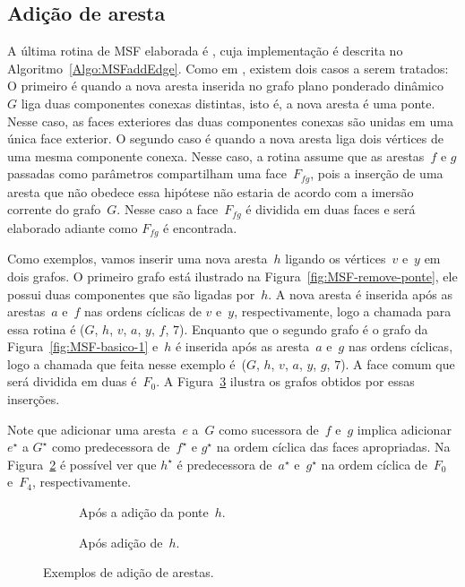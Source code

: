 \subsection{Adição de aresta}

A última rotina de MSF elaborada é \MSFaddEdge{}, cuja implementação é descrita no Algoritmo~\ref{Algo:MSFaddEdge}.
Como em \MSFdelEdge{}, existem dois casos a serem tratados: O primeiro é quando a nova aresta inserida no grafo plano ponderado dinâmico~$G$ liga duas componentes conexas distintas, isto é, a nova aresta é uma ponte.
Nesse caso, as faces exteriores das duas componentes conexas são unidas em uma única face exterior.
O segundo caso é quando a nova aresta liga dois vértices de uma mesma componente conexa.
Nesse caso, a rotina \MSFaddEdge{} assume que as arestas~$f$ e $g$ passadas como parâmetros compartilham uma face~$F_{fg}$, pois a inserção de uma aresta que não obedece essa hipótese não estaria de acordo com a imersão corrente do grafo~$G$.
Nesse caso a face~$F_{fg}$ é dividida em duas faces e será elaborado adiante como $F_{fg}$ é encontrada.

Como exemplos, vamos inserir uma nova aresta~$h$ ligando os vértices~$v$ e~$y$ em dois grafos.
O primeiro grafo está ilustrado na Figura~\ref{fig:MSF-remove-ponte}, ele possui duas componentes que são ligadas por~$h$. 
A nova aresta é inserida após as arestas~$a$ e~$f$ nas ordens cíclicas de $v$ e~$y$, respectivamente, logo a chamada para essa rotina é \MSFaddEdge($G$, $h$, $v$, $a$, $y$, $f$, $7$).
Enquanto que o segundo grafo é o grafo da Figura~\ref{fig:MSF-basico-1} e~$h$ é inserida após as aresta~$a$ e~$g$ nas ordens cíclicas, logo a chamada que feita nesse exemplo é~\MSFaddEdge($G$, $h$, $v$, $a$, $y$, $g$, $7$).
A face comum que será dividida em duas é~$F_0$.
A Figura~\ref{fig:antes-depois-adiciona} ilustra os grafos obtidos por essas inserções.

Note que adicionar uma aresta~$e$ a~$G$ como sucessora de~$f$ e~$g$ implica adicionar $e^\star$ a $G^\star$ como predecessora de~$f^\star$ e $g^\star$ na ordem cíclica das faces apropriadas.  
Na Figura~\ref{fig:MSF-adiciona-nao-ponte} é possível ver que $h^\star$ é predecessora de~$a^\star$ e~$g^\star$ na ordem cíclica de~$F_0$ e~$F_4$, respectivamente.

\begin{figure}[htb]
\begin{subfigure}{0.45\textwidth}
\scalebox{1}{

}
\caption{Após a adição da ponte~$h$.}
\label{fig:MSF-adiciona-ponte}
\end{subfigure}
\begin{subfigure}{0.45\textwidth}
\scalebox{1}{

}
\caption{Após adição de~$h$.}
\label{fig:MSF-adiciona-nao-ponte}
\end{subfigure}
\caption{Exemplos de adição de arestas.}
\label{fig:antes-depois-adiciona}
\end{figure}


